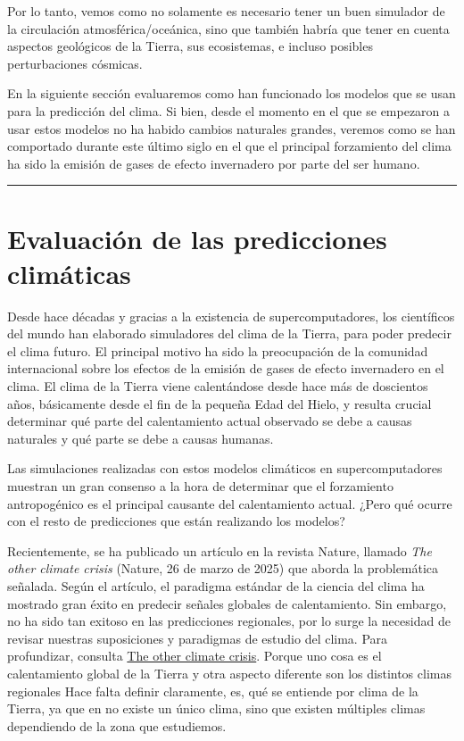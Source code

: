 \documentclass[
  10pt,
  a4paper,
  DIV=11,
  numbers=noendperiod,
  open=any]{scrreprt}
\numberwithin{equation}{chapter}
\numberwithin{equation}{chapter}
\renewcommand{\[}{\begin{equation}}
\renewcommand{\]}{\end{equation}}
\begin{document}
Por lo tanto, vemos como no solamente es necesario tener un buen
simulador de la circulación atmosférica/oceánica, sino que también
habría que tener en cuenta aspectos geológicos de la Tierra, sus
ecosistemas, e incluso posibles perturbaciones cósmicas.

En la siguiente sección evaluaremos como han funcionado los modelos que
se usan para la predicción del clima. Si bien, desde el momento en el
que se empezaron a usar estos modelos no ha habido cambios naturales
grandes, veremos como se han comportado durante este último siglo en el
que el principal forzamiento del clima ha sido la emisión de gases de
efecto invernadero por parte del ser humano.

\begin{center}\rule{0.5\linewidth}{0.5pt}\end{center}


\chapter{Evaluación de las predicciones
climáticas}\label{evaluaciuxf3n-de-las-predicciones-climuxe1ticas}

Desde hace décadas y gracias a la existencia de supercomputadores, los
científicos del mundo han elaborado simuladores del clima de la Tierra,
para poder predecir el clima futuro. El principal motivo ha sido la
preocupación de la comunidad internacional sobre los efectos de la
emisión de gases de efecto invernadero en el clima. El clima de la
Tierra viene calentándose desde hace más de doscientos años, básicamente
desde el fin de la pequeña Edad del Hielo, y resulta crucial determinar
qué parte del calentamiento actual observado se debe a causas naturales
y qué parte se debe a causas humanas.

Las simulaciones realizadas con estos modelos climáticos en
supercomputadores muestran un gran consenso a la hora de determinar que
el forzamiento antropogénico es el principal causante del calentamiento
actual. ¿Pero qué ocurre con el resto de predicciones que están
realizando los modelos?

Recientemente, se ha publicado un artículo en la revista Nature, llamado
\emph{The other climate crisis} (Nature, 26 de marzo de 2025) que aborda
la problemática señalada. Según el artículo, el paradigma estándar de la
ciencia del clima ha mostrado gran éxito en predecir señales globales de
calentamiento. Sin embargo, no ha sido tan exitoso en las predicciones
regionales, por lo surge la necesidad de revisar nuestras suposiciones y
paradigmas de estudio del clima. Para profundizar, consulta
\href{https://www.nature.com/articles/s41586-025-08680-1}{The other
climate crisis}. Porque uno cosa es el calentamiento global de la Tierra
y otra aspecto diferente son los distintos climas regionales Hace falta
definir claramente, es, qué se entiende por clima de la Tierra, ya que
en no existe un único clima, sino que existen múltiples climas
dependiendo de la zona que estudiemos.
\end{document}
